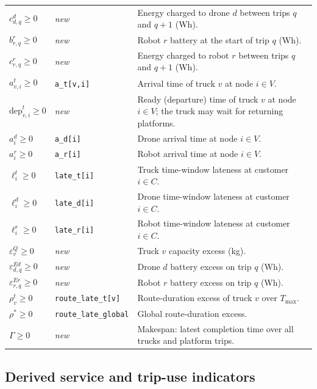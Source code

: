 \documentclass[10pt]{article}
\begin{document}
{\begin{longtable}{@{}p{}p{}p{}@{}}
$c^d_{d,q}\ge 0$ & \emph{new} & Energy charged to drone $d$ between trips $q$ and $q+1$ (Wh). \\
$b^r_{r,q}\ge 0$ & \emph{new} & Robot $r$ battery at the start of trip $q$ (Wh). \\
$c^r_{r,q}\ge 0$ & \emph{new} & Energy charged to robot $r$ between trips $q$ and $q+1$ (Wh). \\
$a^t_{v,i}\ge 0$ & \texttt{a\_t[v,i]} & Arrival time of truck $v$ at node $i\in V$. \\
$\mathrm{dep}^t_{v,i}\ge 0$ & \emph{new} & Ready (departure) time of truck $v$ at node $i\in V$; the truck may wait for returning platforms. \\
$a^d_i\ge 0$ & \texttt{a\_d[i]} & Drone arrival time at node $i\in V$. \\
$a^r_i\ge 0$ & \texttt{a\_r[i]} & Robot arrival time at node $i\in V$. \\
$\ell^t_i\ge 0$ & \texttt{late\_t[i]} & Truck time-window lateness at customer $i\in C$. \\
$\ell^d_i\ge 0$ & \texttt{late\_d[i]} & Drone time-window lateness at customer $i\in C$. \\
$\ell^r_i\ge 0$ & \texttt{late\_r[i]} & Robot time-window lateness at customer $i\in C$. \\
$\varepsilon^Q_v\ge 0$ & \emph{new} & Truck $v$ capacity excess (kg). \\
$\varepsilon^{Ed}_{d,q}\ge 0$ & \emph{new} & Drone $d$ battery excess on trip $q$ (Wh). \\
$\varepsilon^{Er}_{r,q}\ge 0$ & \emph{new} & Robot $r$ battery excess on trip $q$ (Wh). \\
$\rho^t_v\ge 0$ & \texttt{route\_late\_t[v]} & Route-duration excess of truck $v$ over $T_{\max}$. \\
$\rho^*\ge 0$ & \texttt{route\_late\_global} & Global route-duration excess. \\
$\Gamma\ge 0$ & \emph{new} & Makespan: latest completion time over all trucks and platform trips. \\
\bottomrule
\end{longtable}
}

\subsection{Derived service and trip-use indicators}
\end{document}
